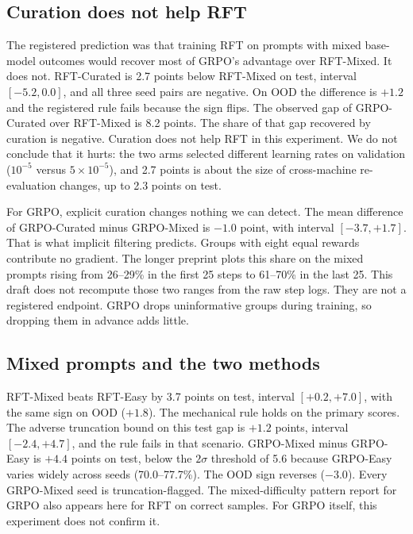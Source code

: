 \subsection{Curation does not help RFT}
\label{sec:res-curation}

The registered prediction was that training RFT on prompts with mixed base-model outcomes would recover most of GRPO's advantage over RFT-Mixed. It does not. RFT-Curated is 2.7 points below RFT-Mixed on test, interval $[-5.2, 0.0]$, and all three seed pairs are negative. On OOD the difference is $+1.2$ and the registered rule fails because the sign flips. The observed gap of GRPO-Curated over RFT-Mixed is 8.2 points. The share of that gap recovered by curation is negative. Curation does not help RFT in this experiment. We do not conclude that it hurts: the two arms selected different learning rates on validation ($10^{-5}$ versus $5{\times}10^{-5}$), and 2.7 points is about the size of cross-machine re-evaluation changes, up to 2.3 points on test.

For GRPO, explicit curation changes nothing we can detect. The mean difference of GRPO-Curated minus GRPO-Mixed is $-1.0$ point, with interval $[-3.7, +1.7]$. That is what implicit filtering predicts. Groups with eight equal rewards contribute no gradient. The longer preprint plots this share on the mixed prompts rising from 26--29\% in the first 25 steps to 61--70\% in the last 25. This draft does not recompute those two ranges from the raw step logs. They are not a registered endpoint. GRPO drops uninformative groups during training, so dropping them in advance adds little.

\subsection{Mixed prompts and the two methods}
\label{sec:res-mixed}

RFT-Mixed beats RFT-Easy by 3.7 points on test, interval $[+0.2, +7.0]$, with the same sign on OOD ($+1.8$). The mechanical rule holds on the primary scores. The adverse truncation bound on this test gap is $+1.2$ points, interval $[-2.4, +4.7]$, and the rule fails in that scenario. GRPO-Mixed minus GRPO-Easy is $+4.4$ points on test, below the $2\sigma$ threshold of 5.6 because GRPO-Easy varies widely across seeds (70.0--77.7\%). The OOD sign reverses ($-3.0$). Every GRPO-Mixed seed is truncation-flagged. The mixed-difficulty pattern \citet{bauer2026} report for GRPO also appears here for RFT on correct samples. For GRPO itself, this experiment does not confirm it.

